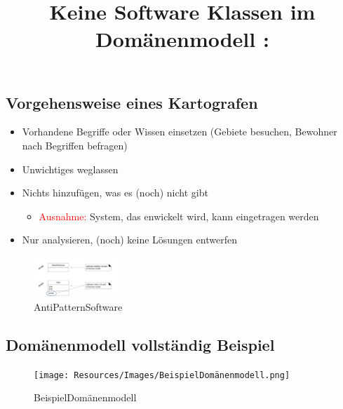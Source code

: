\documentclass{article}
\begin{document}
\subsection{Vorgehensweise eines Kartografen}

\begin{itemize}
	\item Vorhandene Begriffe oder Wissen einsetzen (Gebiete besuchen, Bewohner nach Begriffen befragen)
	\item Unwichtiges weglassen
	\item Nichts hinzufügen, was es (noch) nicht gibt 
	\begin{itemize}
		\item 	\textcolor {red} {Ausnahme:} System, das enwickelt wird, kann eingetragen werden
	\end{itemize}
	\item Nur analysieren, (noch) keine Lösungen entwerfen

\end{itemize}

\title {Keine Software Klassen im Domänenmodell :}

\begin{figure}[H]
	\centering
	\includegraphics[width=0.3\textwidth] {Resources/Images/AntiPatternSoftware.png}
	\caption{\label{fig:AntiPatternSoftware}AntiPatternSoftware}
	\end{figure}


\subsection{Domänenmodell vollständig Beispiel}

\begin{figure}[H]
	\centering
	\texttt{[image: Resources/Images/BeispielDomänenmodell.png]}
	\caption{\label{fig:BeispielDomänenmodell}BeispielDomänenmodell}
	\end{figure}
\end{document}
